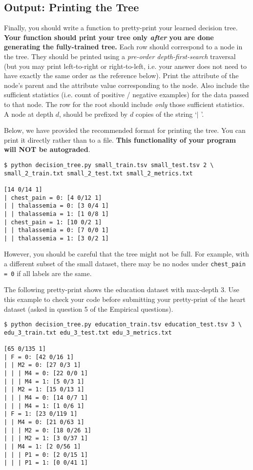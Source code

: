 \subsection{Output: Printing the Tree}
\label{sec:printtree}

Finally, you should write a function to pretty-print your learned decision tree. \textbf{Your function should print your tree only \emph{after} you are done generating the fully-trained tree.} Each row should correspond to a node in the tree. They should be printed using a \emph{pre-order depth-first-search} traversal (but you may print left-to-right or right-to-left, i.e. your answer does not need to have exactly the same order as the reference below). Print the attribute of the node's parent and the attribute value corresponding to the node. Also include the sufficient statistics (i.e. count of positive / negative examples) for the data passed to that node. The row for the root should include \emph{only} those sufficient statistics. A node at depth $d$, should be prefixed by $d$ copies of the string `$\mid$ '.

Below, we have provided the recommended format for printing the tree. You can print it directly rather than to a file. \textbf{This functionality of your program will NOT be autograded}.

\begin{lstlisting}[language=Shell]
$ python decision_tree.py small_train.tsv small_test.tsv 2 \ 
small_2_train.txt small_2_test.txt small_2_metrics.txt

[14 0/14 1]
| chest_pain = 0: [4 0/12 1]
| | thalassemia = 0: [3 0/4 1]
| | thalassemia = 1: [1 0/8 1]
| chest_pain = 1: [10 0/2 1]
| | thalassemia = 0: [7 0/0 1]
| | thalassemia = 1: [3 0/2 1]
\end{lstlisting}

However, you should be careful that the tree might not be full. For example, with a different subset of the small dataset, there may be no nodes under \lstinline{chest_pain = 0} if all labels are the same.

The following pretty-print shows the education dataset with max-depth 3.  Use this example to check your code before submitting your pretty-print of the heart dataset (asked in question 5 of the Empirical questions).  

\begin{lstlisting}[language=Shell]
$ python decision_tree.py education_train.tsv education_test.tsv 3 \
edu_3_train.txt edu_3_test.txt edu_3_metrics.txt

[65 0/135 1]
| F = 0: [42 0/16 1]
| | M2 = 0: [27 0/3 1]
| | | M4 = 0: [22 0/0 1]
| | | M4 = 1: [5 0/3 1]
| | M2 = 1: [15 0/13 1]
| | | M4 = 0: [14 0/7 1]
| | | M4 = 1: [1 0/6 1]
| F = 1: [23 0/119 1]
| | M4 = 0: [21 0/63 1]
| | | M2 = 0: [18 0/26 1]
| | | M2 = 1: [3 0/37 1]
| | M4 = 1: [2 0/56 1]
| | | P1 = 0: [2 0/15 1]
| | | P1 = 1: [0 0/41 1]
\end{lstlisting}

